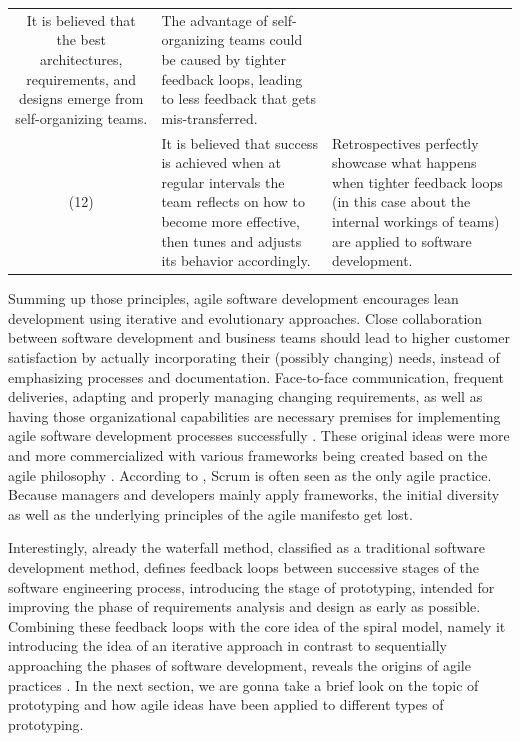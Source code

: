 \begin{block}
\begin{longtable}{@{}cp{}p{}@{}}
    It is believed that the best architectures, requirements, and designs emerge from self-organizing teams.&
    The advantage of self-organizing teams could be caused by tighter feedback loops, leading to less feedback that gets mis-transferred.
    \\
    (12)&
    It is believed that success is achieved when at regular intervals the team reflects on how to become more effective, then tunes and adjusts its behavior accordingly.&
    Retrospectives perfectly showcase what happens when tighter feedback loops (in this case about the internal workings of teams) are applied to software development.
    \\
    \bottomrule
\end{longtable}
\end{block}


Summing up those principles, agile software development encourages lean development using iterative and evolutionary approaches.
Close collaboration between software development and business teams should lead to higher customer satisfaction by actually incorporating their (possibly changing) needs, instead of emphasizing processes and documentation.
Face-to-face communication, frequent deliveries, adapting and properly managing changing requirements, as well as having those organizational capabilities are necessary premises for implementing agile software development processes successfully \cite{misra_agile_2012}.
These original ideas were more and more commercialized with various frameworks being created based on the agile philosophy \cite{hohl_back_2018}.
According to \citeauthor{hohl_back_2018}, Scrum is often seen as the only agile practice.
Because managers and developers mainly apply frameworks, the initial diversity as well as the underlying principles of the agile manifesto get lost.



Interestingly, already the waterfall method\addref, classified as a traditional software development method, defines feedback loops between successive stages of the software engineering process, introducing the stage of prototyping, intended for improving the phase of requirements analysis and design as early as possible.
Combining these feedback loops with the core idea of the spiral model\addref, namely it introducing the idea of an iterative approach in contrast to sequentially approaching the phases of software development, reveals the origins of agile practices \cite{misra_agile_2012}.
In the next section, we are gonna take a brief look on the topic of prototyping and how agile ideas have been applied to different types of prototyping.


